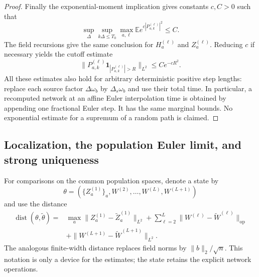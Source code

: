 \begin{proof}
Finally the exponential-moment implication gives constants $c,C>0$
such that
\[
 \sup_\Delta\sup_{k\Delta\le T_0}\max_{a,\ell}
 \mathbb E e^{c|P_{a,k}^{(\ell)}|^2}\le C.
\]
The field recursions give the same conclusion for $H_a^{(\ell)}$ and
$Z_a^{(\ell)}$.  Reducing
$c$ if necessary yields the cutoff estimate
\[
 \|P_{a,k}^{(\ell)}
       \mathbf{1}_{|P_{a,k}^{(\ell)}|>R}\|_{L^2}
 \le Ce^{-cR^2}.
\]
All these estimates also hold for arbitrary deterministic positive step
lengths: replace each source factor $\Delta\omega_b$ by
$\Delta_s\omega_b$ and use their total time.  In particular, a
recomputed network at an affine Euler interpolation time is obtained by
appending one fractional Euler step.  It has the same marginal bounds.
No exponential estimate for a supremum of a random path is claimed.
\end{proof}

\subsection{Localization, the population Euler limit, and strong uniqueness}
\label{app:localization}

For comparisons on the common population spaces, denote a state by
\[
\theta=(\{Z_a^{(1)}\}_a,W^{(2)},\ldots,W^{(L)},W^{(L+1)})
\]
and use the distance
\begin{align*}
 \operatorname{dist}(\theta,\widetilde\theta)
 ={}&\max_a\|Z_a^{(1)}-\widetilde Z_a^{(1)}\|_{L^2}
   +\sum_{\ell=2}^L
       \|W^{(\ell)}-\widetilde W^{(\ell)}\|_{\operatorname{op}}\\
 &+\|W^{(L+1)}-\widetilde W^{(L+1)}\|_{L^2}.
\end{align*}
The analogous finite-width distance replaces field norms by
$\|b\|_2/\sqrt n$.  This notation is only a device for the estimates;
the state retains the explicit network operations.

